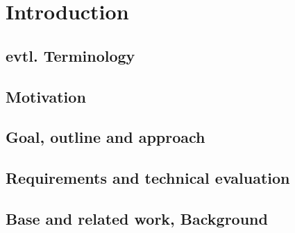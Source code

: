 \chapter{Introduction}
\label{chp:introduction}

\section{evtl. Terminology}

\section{Motivation}




\section{Goal, outline and approach}



\section{Requirements and technical evaluation}



\section{Base and related work, Background}





